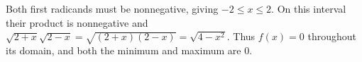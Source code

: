 Both first radicands must be nonnegative, giving $-2\le x\le2$. On this interval their product is nonnegative and $\sqrt{2+x}\sqrt{2-x}=\sqrt{(2+x)(2-x)}=\sqrt{4-x^2}$. Thus $f(x)=0$ throughout its domain, and both the minimum and maximum are $\boxed{0}$.
